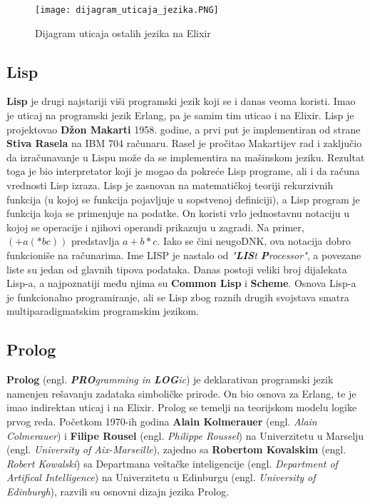 \documentclass[12pt,oneside]{memoir}
\begin{document}
\begin{figure}[!ht]
  \centering
  \texttt{[image: dijagram\_uticaja\_jezika.PNG]}
  \caption{Dijagram uticaja ostalih jezika na Elixir}
  \label{fig:02}
\end{figure}

\newpage

\subsection{Lisp}
\textbf{Lisp} je drugi najstariji viši programski jezik koji se i danas veoma koristi. Imao je uticaj na programski jezik Erlang, pa je samim tim uticao i na Elixir. Lisp je projektovao \textbf{Džon Makarti} 1958. godine, a prvi put je implementiran od strane \textbf{Stiva Rasela} na IBM 704 računaru. Rasel je pročitao Makartijev rad i zaključio da izračunavanje u Lispu može da se implementira na mašinskom jeziku. Rezultat toga je bio  interpretator koji je mogao da pokreće Lisp programe, ali i da računa vrednosti Lisp izraza. Lisp je zasnovan na matematičkoj teoriji rekurzivnih funkcija (u kojoj se funkcija pojavljuje u sopstvenoj definiciji), a Lisp program je funkcija koja se primenjuje na podatke. On koristi vrlo jednostavnu notaciju u kojoj se operacije i njihovi operandi prikazuju u zagradi. Na primer, $(+ a ( * b c))$ predstavlja $a + b * c$. Iako se čini neugoDNK, ova notacija dobro funkcioniše na računarima. Ime LISP je nastalo od \textit{"\textbf{LIS}t \textbf{P}rocessor"}, a povezane liste su jedan od glavnih tipova podataka. Danas postoji veliki broj dijalekata Lisp-a, a najpoznatiji među njima su \textbf{Common Lisp} i \textbf{Scheme}. Osnova Lisp-a je funkcionalno programiranje, ali se Lisp zbog raznih drugih svojstava smatra multiparadigmatskim programskim jezikom.

\subsection{Prolog}
\textbf{Prolog} (engl. \textit{\textbf{PRO}gramming in \textbf{LOG}ic}) je deklarativan programski jezik namenjen rešavanju zadataka simboličke prirode. On bio osnova za Erlang, te je imao indirektan uticaj i na Elixir. Prolog se temelji na teorijskom modelu logike prvog reda. Početkom 1970-ih godina \textbf{Alain Kolmerauer} (engl. \textit{Alain Colmerauer}) i \textbf{Filipe Rousel} (engl. \textit{Philippe Roussel}) na Univerzitetu u Marselju (engl. \textit{University of Aix-Marseille}), zajedno sa \textbf{Robertom Kovalskim} (engl. \textit{Robert Kowalski}) sa Departmana veštačke inteligencije (engl. \textit{Department of Artifical Intelligence}) na Univerzitetu u Edinburgu (engl. \textit{University of Edinburgh}), razvili su osnovni dizajn jezika Prolog.
\end{document}
